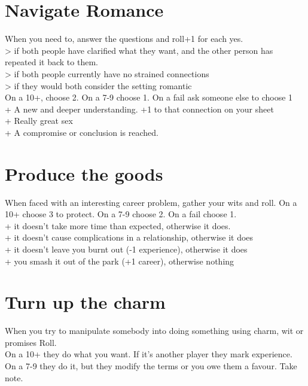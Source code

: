\documentclass[letterpaper]{twentysecondcv} %
\begin{document}
\newpage

\section{Navigate Romance}
When you need to, answer the questions and roll+1 for each yes. \\
> if both people have clarified what they want, and the other person has repeated it back to them.\\
> if both people currently have no strained connections\\
> if they would both consider the setting romantic\\
On a 10+, choose 2. On a 7-9 choose 1. On a fail ask someone else to choose 1\\
+ A new and deeper understanding. +1 to that connection on your sheet\\
+ Really great sex\\
+ A compromise or conclusion is reached.\\

\section{Produce the goods}
When faced with an interesting career problem, gather your wits and roll.
On a 10+ choose 3 to protect. On a 7-9 choose 2. On a fail choose 1.\\
+ it doesn't take more time than expected, otherwise it does.\\
+ it doesn't cause complications in a relationship, otherwise it does\\
+ it doesn't leave you burnt out (-1 experience), otherwise it does\\
+ you smash it out of the park (+1 career), otherwise nothing\\

\section{Turn up the charm}
When you try to manipulate somebody into doing something using charm, wit or promises Roll.\\
On a 10+ they do what you want. If it's another player they mark experience.\\
On a 7-9 they do it, but they modify the terms or you owe them a favour. Take note.\\
\end{document}
